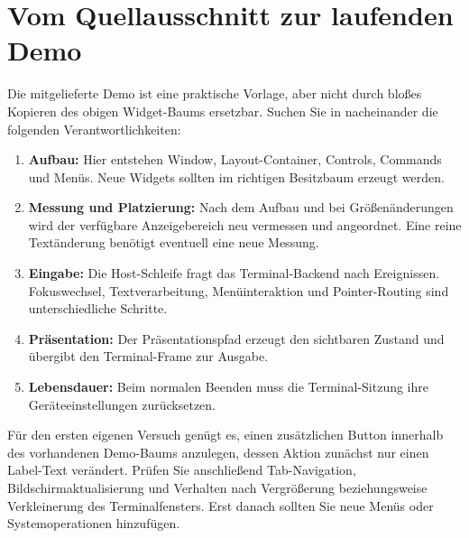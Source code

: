 \section{Vom Quellausschnitt zur laufenden Demo}
Die mitgelieferte Demo ist eine praktische Vorlage, aber nicht
durch bloßes Kopieren des obigen Widget-Baums ersetzbar.
Suchen Sie in 
nacheinander die folgenden Verantwortlichkeiten:
\begin{enumerate}
\item \textbf{Aufbau:} Hier entstehen Window, Layout-Container,
Controls, Commands und Menüs. Neue Widgets sollten im richtigen
Besitzbaum erzeugt werden.
\item \textbf{Messung und Platzierung:} Nach dem Aufbau und bei
Größenänderungen wird der verfügbare Anzeigebereich neu vermessen
und angeordnet. Eine reine Textänderung benötigt eventuell eine
neue Messung.
\item \textbf{Eingabe:} Die Host-Schleife fragt das Terminal-Backend
nach Ereignissen. Fokuswechsel, Textverarbeitung, Menüinteraktion
und Pointer-Routing sind unterschiedliche Schritte.
\item \textbf{Präsentation:} Der Präsentationspfad erzeugt den
sichtbaren Zustand und übergibt den Terminal-Frame zur Ausgabe.
\item \textbf{Lebensdauer:} Beim normalen Beenden muss die
Terminal-Sitzung ihre Geräteeinstellungen zurücksetzen.
\end{enumerate}
Für den ersten eigenen Versuch genügt es, einen zusätzlichen
Button innerhalb des vorhandenen Demo-Baums anzulegen,
dessen Aktion zunächst nur einen Label-Text verändert.
Prüfen Sie anschließend Tab-Navigation, Bildschirmaktualisierung
und Verhalten nach Vergrößerung beziehungsweise Verkleinerung
des Terminalfensters. Erst danach sollten Sie neue
Menüs oder Systemoperationen hinzufügen.

